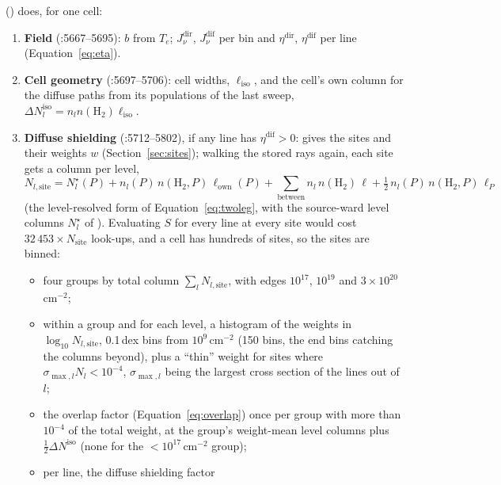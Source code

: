  () does, for one cell:
\begin{enumerate}
\item \textbf{Field} (:5667--5695): $b$ from $T_e$; $J_\nu^{\mathrm{dir}}$,
  $J_\nu^{\mathrm{dif}}$ per bin and $\eta^{\mathrm{dir}}$,
  $\eta^{\mathrm{dif}}$ per line (Equation~\ref{eq:eta}).
\item \textbf{Cell geometry} (:5697--5706): cell widths, $\ell_{\mathrm{iso}}$,
  and the cell's own column for the diffuse paths from its populations of the
  last sweep, $\Delta N^{\mathrm{iso}}_l = n_l n(\mathrm{H_2})\ell_{\mathrm{iso}}$.
\item \textbf{Diffuse shielding} (:5712--5802), if any line has
  $\eta^{\mathrm{dif}}>0$:  gives the sites and their
  weights $w$ (Section~\ref{sec:sites}); walking the stored rays again, each
  site gets a column per level,
  \begin{equation}
    N_{l,\mathrm{site}} = N^\star_l(P) + n_l(P)\,n(\mathrm{H_2},P)\,\ell_{\mathrm{own}}(P)
        + \sum_{\mathrm{between}} n_l\,n(\mathrm{H_2})\,\ell + \tfrac12\,n_l(P)\,n(\mathrm{H_2},P)\,\ell_P
  \end{equation}
  (the level-resolved form of Equation~\ref{eq:twoleg}, with the source-ward
  level columns $N^\star_l$ of ). Evaluating $S$ for every
  line at every site would cost $32\,453\times N_{\mathrm{site}}$ look-ups,
  and a cell has hundreds of sites, so the sites are binned:
  \begin{itemize}
  \item four groups by total column $\sum_l N_{l,\mathrm{site}}$, with edges
    $10^{17}$, $10^{19}$ and $3\times10^{20}$\,cm$^{-2}$;
  \item within a group and for each level, a histogram of the weights in
    $\log_{10}N_{l,\mathrm{site}}$, 0.1\,dex bins from $10^9$\,cm$^{-2}$
    (150 bins, the end bins catching the columns beyond), plus a ``thin'' weight for sites where
    $\sigma_{\max,l}N_l<10^{-4}$, $\sigma_{\max,l}$ being the largest
    cross section of the lines out of $l$;
  \item the overlap factor (Equation~\ref{eq:overlap}) once per group with
    more than $10^{-4}$ of the total weight, at the group's weight-mean
    level columns plus $\frac12\Delta N^{\mathrm{iso}}$ (none for the
    $<10^{17}$\,cm$^{-2}$ group);
  \item per line, the diffuse shielding factor
    \begin{equation}

\end{equation}
\end{itemize}
\end{enumerate}
